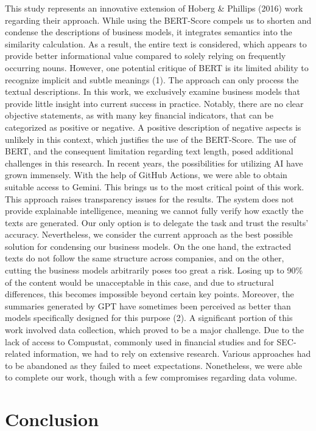 \documentclass[
]{article}
\begin{document}
This study represents an innovative extension of Hoberg \& Phillips
(2016) work regarding their approach. While using the BERT-Score compels
us to shorten and condense the descriptions of business models, it
integrates semantics into the similarity calculation. As a result, the
entire text is considered, which appears to provide better informational
value compared to solely relying on frequently occurring nouns. However,
one potential critique of BERT is its limited ability to recognize
implicit and subtle meanings (1). The approach can only process the
textual descriptions. In this work, we exclusively examine business
models that provide little insight into current success in practice.
Notably, there are no clear objective statements, as with many key
financial indicators, that can be categorized as positive or negative. A
positive description of negative aspects is unlikely in this context,
which justifies the use of the BERT-Score. The use of BERT, and the
consequent limitation regarding text length, posed additional challenges
in this research. In recent years, the possibilities for utilizing AI
have grown immensely. With the help of GitHub Actions, we were able to
obtain suitable access to Gemini. This brings us to the most critical
point of this work. This approach raises transparency issues for the
results. The system does not provide explainable intelligence, meaning
we cannot fully verify how exactly the texts are generated. Our only
option is to delegate the task and trust the results' accuracy.
Nevertheless, we consider the current approach as the best possible
solution for condensing our business models. On the one hand, the
extracted texts do not follow the same structure across companies, and
on the other, cutting the business models arbitrarily poses too great a
risk. Losing up to 90\% of the content would be unacceptable in this
case, and due to structural differences, this becomes impossible beyond
certain key points. Moreover, the summaries generated by GPT have
sometimes been perceived as better than models specifically designed for
this purpose (2). A significant portion of this work involved data
collection, which proved to be a major challenge. Due to the lack of
access to Compustat, commonly used in financial studies and for
SEC-related information, we had to rely on extensive research. Various
approaches had to be abandoned as they failed to meet expectations.
Nonetheless, we were able to complete our work, though with a few
compromises regarding data volume.

\section{Conclusion}\label{conclusion}
\end{document}
